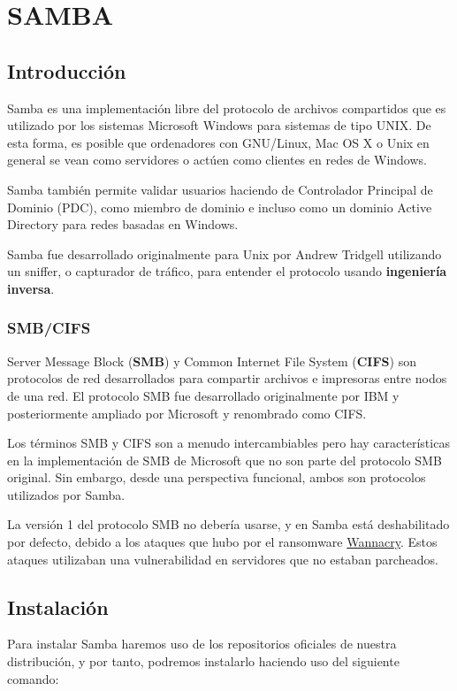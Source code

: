 \chapter{SAMBA}
\section{Introducción}
Samba es una implementación libre del protocolo de archivos compartidos que es utilizado por los sistemas Microsoft Windows para sistemas de tipo UNIX. De esta forma, es posible que ordenadores con GNU/Linux, Mac OS X o Unix en general se vean como servidores o actúen como clientes en redes de Windows.

Samba también permite validar usuarios haciendo de Controlador Principal de Dominio (PDC), como miembro de dominio e incluso como un dominio Active Directory para redes basadas en Windows.

Samba fue desarrollado originalmente para Unix por Andrew Tridgell utilizando un sniffer, o capturador de tráfico, para entender el protocolo usando \textbf{ingeniería inversa}.

\subsection{SMB/CIFS}
Server Message Block (\textbf{SMB}) y Common Internet File System (\textbf{CIFS}) son protocolos de red desarrollados para compartir archivos e impresoras entre nodos de una red. El protocolo SMB fue desarrollado originalmente por IBM y posteriormente ampliado por Microsoft y renombrado como CIFS.

Los términos SMB y CIFS son a menudo intercambiables pero hay características en la implementación de SMB de Microsoft que no son parte del protocolo SMB original. Sin embargo, desde una perspectiva funcional, ambos son protocolos utilizados por Samba.

La versión 1 del protocolo SMB no debería usarse, y en Samba está deshabilitado por defecto, debido a los ataques que hubo por el ransomware \href{https://es.wikipedia.org/wiki/Ataques_ransomware_WannaCry}{Wannacry}. Estos ataques utilizaban una vulnerabilidad en servidores que no estaban parcheados.

\section{Instalación}
Para instalar Samba haremos uso de los repositorios oficiales de nuestra distribución, y por tanto, podremos instalarlo haciendo uso del siguiente comando:

